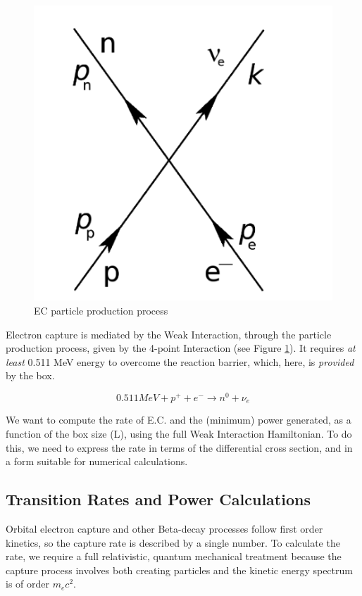\documentclass[%
 aip,
 jmp,%
 amsmath,amssymb,
 reprint,%
]{revtex4-1}
\begin{document}
\begin{figure}
   \includegraphics[scale=0.25]{img/feynman.png}
   \caption{EC particle production process}
  \label{fig:ppp}
\end{figure}

Electron capture is mediated by the Weak Interaction, through the particle production process, given by the 4-point Interaction (see Figure \ref{fig:ppp}).   It requires \emph{at least} 0.511 MeV energy to overcome the reaction barrier, which, here, is \emph{provided} by the box. 

$$0.511{MeV}+p^{+}+e^{-}\rightarrow n^{0}+\nu_{e}$$  

We want to compute the rate of E.C. and the (minimum) power generated, as a function of the box size (L), using the full Weak Interaction Hamiltonian.  To do this, we need to express the rate in terms of the differential cross section, and in a form suitable for numerical calculations.  

\subsection{Transition Rates and Power Calculations}

Orbital electron capture and other Beta-decay processes follow first order kinetics, so the capture rate is described by a single number. 
To calculate the rate, we require a full relativistic, quantum mechanical treatment because the capture process involves both creating particles and the kinetic energy spectrum is of order $m_{e}c^{2}$.
\end{document}
